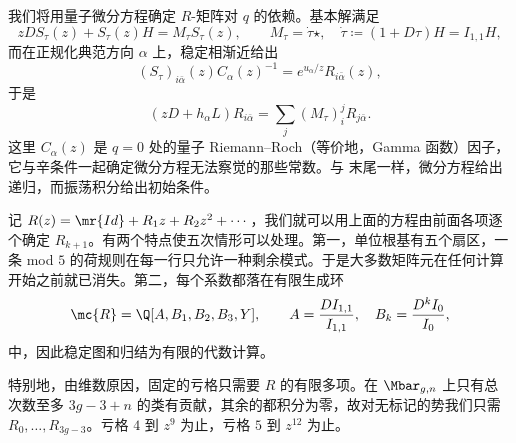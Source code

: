 我们将用量子微分方程确定 \(R\)-矩阵对 \(q\) 的依赖。基本解满足
\[ zDS_{\tau}(z) + S_{\tau}(z)H = M_{\tau}S_{\tau}(z), \qquad M_{\tau} = \dot{\tau}\star, \quad \dot{\tau} \coloneqq (1+D\tau)H = I_{1,1}H, \]
而在正规化典范方向 \(\alpha\) 上，稳定相渐近给出
\[ (S_{\tau})_{i\bar{\alpha}}(z)C_{\alpha}(z)^{-1} = e^{u_{\alpha}/z}R_{i\bar{\alpha}}(z), \]
于是
\[ (zD+h_{\alpha}L)R_{i\bar{\alpha}} = \sum_j (M_{\tau})_i^j R_{j\bar{\alpha}}. \]
这里 \(C_{\alpha}(z)\) 是 \(q=0\) 处的量子 Riemann–Roch（等价地，Gamma 函数）因子，它与辛条件一起确定微分方程无法察觉的那些常数。与  末尾一样，微分方程给出递归，而振荡积分给出初始条件。

记 \(R(z) = \mr{Id} + R_1 z + R_2 z^2 + \cdots\)，我们就可以用上面的方程由前面各项逐个确定 \(R_{k+1}\)。有两个特点使五次情形可以处理。第一，单位根基有五个扇区，一条 mod \(5\) 的荷规则在每一行只允许一种剩余模式。于是大多数矩阵元在任何计算开始之前就已消失。第二，每个系数都落在有限生成环
\[ \mc{R} = \Q[A,B_1,B_2,B_3,Y], \qquad A = \frac{DI_{1,1}}{I_{1,1}}, \quad B_k = \frac{D^k I_0}{I_0}, \]
中，因此稳定图和归结为有限的代数计算。

\begin{rmk}
    特别地，由维数原因，固定的亏格只需要 \(R\) 的有限多项。在 \(\Mbar_{g,n}\) 上只有总次数至多 \(3g-3+n\) 的类有贡献，其余的都积分为零，故对无标记的势我们只需 \(R_0, \ldots, R_{3g-3}\)。亏格 \(4\) 到 \(z^9\) 为止，亏格 \(5\) 到 \(z^{12}\) 为止。
\end{rmk}


